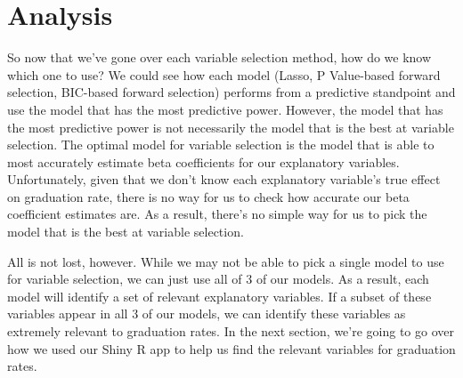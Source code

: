 \documentclass{article}
\begin{document}


\section{Analysis}
So now that we've gone over each variable selection method, how do we know which one to use? We could see how each model (Lasso, P Value-based forward selection, BIC-based forward selection) performs from a predictive standpoint and use the model that has the most predictive power. However, the model that has the most predictive power is not necessarily the model that is the best at variable selection. The optimal model for variable selection is the model that is able to most accurately estimate beta coefficients for our explanatory variables. Unfortunately, given that we don't know each explanatory variable's true effect on graduation rate, there is no way for us to check how accurate our beta coefficient estimates are. As a result, there's no simple way for us to pick the model that is the best at variable selection.

All is not lost, however. While we may not be able to pick a single model to use for variable selection, we can just use all of 3 of our models. As a result, each model will identify a set of relevant explanatory variables. If a subset of these variables appear in all 3 of our models, we can identify these variables as extremely relevant to graduation rates. In the next section, we're going to go over how we used our Shiny R app to help us find the relevant variables for graduation rates.
\end{document}
